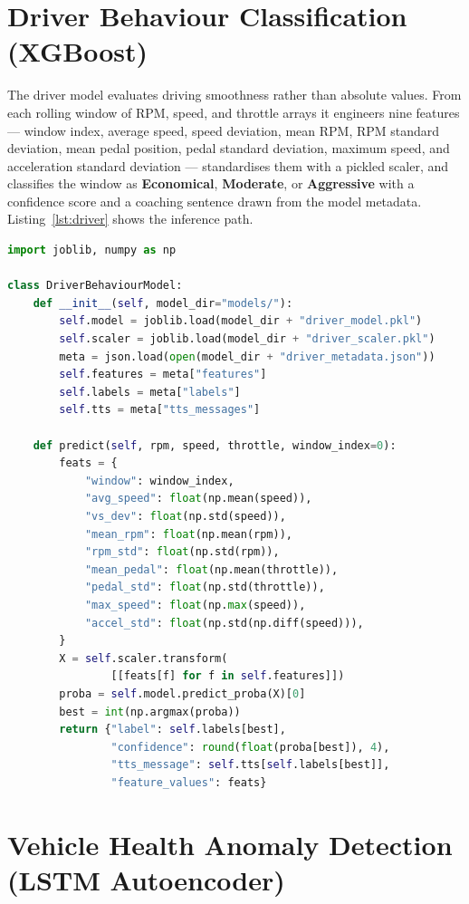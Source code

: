 \documentclass[10pt,a4paper]{report}
\begin{document}
\section{Driver Behaviour Classification (XGBoost)}

The driver model evaluates driving smoothness rather than absolute values. From each rolling window of RPM, speed, and throttle arrays it engineers nine features — window index, average speed, speed deviation, mean RPM, RPM standard deviation, mean pedal position, pedal standard deviation, maximum speed, and acceleration standard deviation — standardises them with a pickled scaler, and classifies the window as \textbf{Economical}, \textbf{Moderate}, or \textbf{Aggressive} with a confidence score and a coaching sentence drawn from the model metadata. Listing~\ref{lst:driver} shows the inference path.

\begin{lstlisting}[language=Python, caption={XGBoost Driver Behaviour Inference}, label={lst:driver}]
import joblib, numpy as np

class DriverBehaviourModel:
    def __init__(self, model_dir="models/"):
        self.model = joblib.load(model_dir + "driver_model.pkl")
        self.scaler = joblib.load(model_dir + "driver_scaler.pkl")
        meta = json.load(open(model_dir + "driver_metadata.json"))
        self.features = meta["features"]
        self.labels = meta["labels"]
        self.tts = meta["tts_messages"]

    def predict(self, rpm, speed, throttle, window_index=0):
        feats = {
            "window": window_index,
            "avg_speed": float(np.mean(speed)),
            "vs_dev": float(np.std(speed)),
            "mean_rpm": float(np.mean(rpm)),
            "rpm_std": float(np.std(rpm)),
            "mean_pedal": float(np.mean(throttle)),
            "pedal_std": float(np.std(throttle)),
            "max_speed": float(np.max(speed)),
            "accel_std": float(np.std(np.diff(speed))),
        }
        X = self.scaler.transform(
                [[feats[f] for f in self.features]])
        proba = self.model.predict_proba(X)[0]
        best = int(np.argmax(proba))
        return {"label": self.labels[best],
                "confidence": round(float(proba[best]), 4),
                "tts_message": self.tts[self.labels[best]],
                "feature_values": feats}
\end{lstlisting}

\section{Vehicle Health Anomaly Detection (LSTM Autoencoder)}
\end{document}
